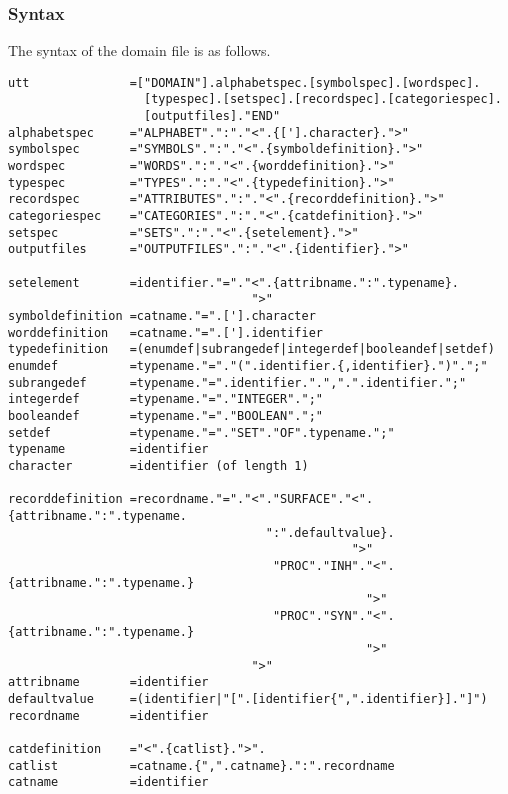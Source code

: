 \subsubsection{Syntax}
The syntax of the domain file is as follows.
\begin{verbatim}
utt              =["DOMAIN"].alphabetspec.[symbolspec].[wordspec].
                   [typespec].[setspec].[recordspec].[categoriespec].
                   [outputfiles]."END"
alphabetspec     ="ALPHABET".":"."<".{['].character}.">"
symbolspec       ="SYMBOLS".":"."<".{symboldefinition}.">"
wordspec         ="WORDS".":"."<".{worddefinition}.">"
typespec         ="TYPES".":"."<".{typedefinition}.">"
recordspec       ="ATTRIBUTES".":"."<".{recorddefinition}.">"
categoriespec    ="CATEGORIES".":"."<".{catdefinition}.">"
setspec          ="SETS".":"."<".{setelement}.">"
outputfiles      ="OUTPUTFILES".":"."<".{identifier}.">"

setelement       =identifier."="."<".{attribname.":".typename}.
                                  ">"
symboldefinition =catname."=".['].character
worddefinition   =catname."=".['].identifier
typedefinition   =(enumdef|subrangedef|integerdef|booleandef|setdef)
enumdef          =typename."="."(".identifier.{,identifier}.")".";"
subrangedef      =typename."=".identifier.".",".".identifier.";"
integerdef       =typename."="."INTEGER".";"
booleandef       =typename."="."BOOLEAN".";"
setdef           =typename."="."SET"."OF".typename.";"
typename         =identifier
character        =identifier (of length 1)

recorddefinition =recordname."="."<"."SURFACE"."<".{attribname.":".typename.
                                    ":".defaultvalue}.
                                                ">"
                                     "PROC"."INH"."<".{attribname.":".typename.}
                                                  ">"
                                     "PROC"."SYN"."<".{attribname.":".typename.}
                                                  ">"
                                  ">"
attribname       =identifier
defaultvalue     =(identifier|"[".[identifier{",".identifier}]."]")
recordname       =identifier

catdefinition    ="<".{catlist}.">".
catlist          =catname.{",".catname}.":".recordname
catname          =identifier
\end{verbatim}
